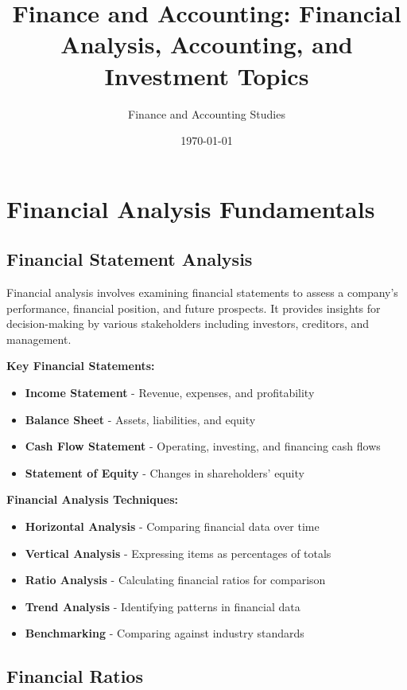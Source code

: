 \documentclass[12pt]{article}
\title{Finance and Accounting: Financial Analysis, Accounting, and Investment Topics}
\author{Finance and Accounting Studies}
\date{\today}
\begin{document}
\maketitle

\section{Financial Analysis Fundamentals}

\subsection{Financial Statement Analysis}
Financial analysis involves examining financial statements to assess a company's performance, financial position, and future prospects. It provides insights for decision-making by various stakeholders including investors, creditors, and management.

\textbf{Key Financial Statements:}
\begin{itemize}
    \item \textbf{Income Statement} - Revenue, expenses, and profitability
    \item \textbf{Balance Sheet} - Assets, liabilities, and equity
    \item \textbf{Cash Flow Statement} - Operating, investing, and financing cash flows
    \item \textbf{Statement of Equity} - Changes in shareholders' equity
\end{itemize}

\textbf{Financial Analysis Techniques:}
\begin{itemize}
    \item \textbf{Horizontal Analysis} - Comparing financial data over time
    \item \textbf{Vertical Analysis} - Expressing items as percentages of totals
    \item \textbf{Ratio Analysis} - Calculating financial ratios for comparison
    \item \textbf{Trend Analysis} - Identifying patterns in financial data
    \item \textbf{Benchmarking} - Comparing against industry standards
\end{itemize}

\subsection{Financial Ratios}
\end{document}
